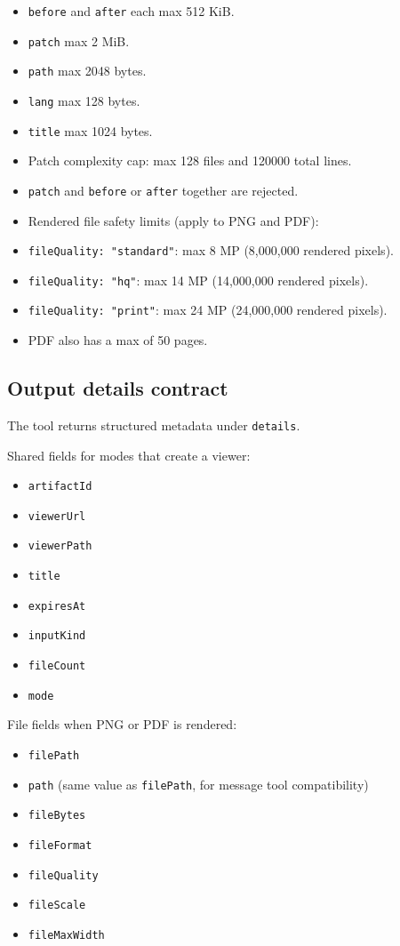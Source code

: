 \begin{itemize}
  \item \texttt{before} and \texttt{after} each max 512 KiB.
  \item \texttt{patch} max 2 MiB.
  \item \texttt{path} max 2048 bytes.
  \item \texttt{lang} max 128 bytes.
  \item \texttt{title} max 1024 bytes.
  \item Patch complexity cap: max 128 files and 120000 total lines.
  \item \texttt{patch} and \texttt{before} or \texttt{after} together are rejected.
  \item Rendered file safety limits (apply to PNG and PDF):
  \item \texttt{fileQuality: "standard"}: max 8 MP (8,000,000 rendered pixels).
  \item \texttt{fileQuality: "hq"}: max 14 MP (14,000,000 rendered pixels).
  \item \texttt{fileQuality: "print"}: max 24 MP (24,000,000 rendered pixels).
  \item PDF also has a max of 50 pages.
\end{itemize}


\subsection{Output details contract}


The tool returns structured metadata under \texttt{details}.

Shared fields for modes that create a viewer:

\begin{itemize}
  \item \texttt{artifactId}
  \item \texttt{viewerUrl}
  \item \texttt{viewerPath}
  \item \texttt{title}
  \item \texttt{expiresAt}
  \item \texttt{inputKind}
  \item \texttt{fileCount}
  \item \texttt{mode}
\end{itemize}


File fields when PNG or PDF is rendered:

\begin{itemize}
  \item \texttt{filePath}
  \item \texttt{path} (same value as \texttt{filePath}, for message tool compatibility)
  \item \texttt{fileBytes}
  \item \texttt{fileFormat}
  \item \texttt{fileQuality}
  \item \texttt{fileScale}
  \item \texttt{fileMaxWidth}
\end{itemize}


